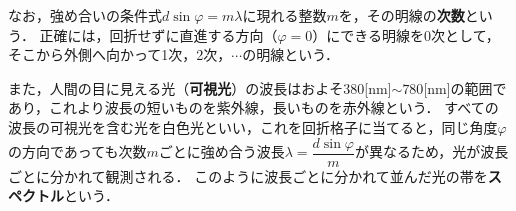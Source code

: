 なお，強め合いの条件式$d\sin \varphi =m\lambda$に現れる整数$m$を，その明線の{\bf 次数}という．
正確には，回折せずに直進する方向（$\varphi =0$）にできる明線を0次として，そこから外側へ向かって1次，2次，$\cdots$の明線という．

また，人間の目に見える光（{\bf 可視光}）の波長はおよそ$380$[nm]$\sim 780$[nm]の範囲であり，これより波長の短いものを紫外線，長いものを赤外線という．
すべての波長の可視光を含む光を白色光といい，これを回折格子に当てると，同じ角度$\varphi$の方向であっても次数$m$ごとに強め合う波長$\lambda =\dfrac{d\sin \varphi}{m}$が異なるため，光が波長ごとに分かれて観測される．
このように波長ごとに分かれて並んだ光の帯を{\bf スペクトル}という．

